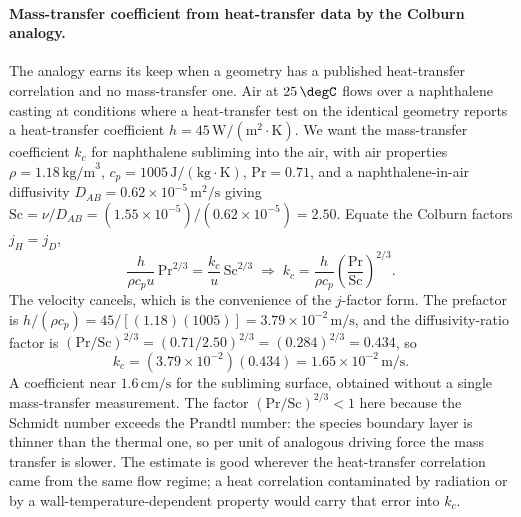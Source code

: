 \paragraph{Mass-transfer coefficient from heat-transfer data by the
Colburn analogy.} The analogy earns its keep when a geometry has a
published heat-transfer correlation and no mass-transfer one. Air at
$25\,\degC$ flows over a naphthalene casting at conditions where a
heat-transfer test on the identical geometry reports a heat-transfer
coefficient $h = 45\,\text{W}/(\text{m}^2\cdot\text{K})$. We want the
mass-transfer coefficient $k_c$ for naphthalene subliming into the air,
with air properties $\rho = 1.18\,\text{kg/m}^3$, $c_p = 1005\,\text{J}/
(\text{kg}\cdot\text{K})$, $\mathrm{Pr} = 0.71$, and a naphthalene-in-air
diffusivity $D_{AB} = 0.62\times 10^{-5}\,\si{\meter\squared\per\second}$
giving $\mathrm{Sc} = \nu/D_{AB} = (1.55\times 10^{-5})/(0.62\times
10^{-5}) = 2.50$. Equate the Colburn factors $j_H = j_D$,
\[
\frac{h}{\rho c_p u}\,\mathrm{Pr}^{2/3} = \frac{k_c}{u}\,\mathrm{Sc}^{2/3}
\;\Rightarrow\; k_c = \frac{h}{\rho c_p}
\left(\frac{\mathrm{Pr}}{\mathrm{Sc}}\right)^{2/3}.
\]
The velocity cancels, which is the convenience of the $j$-factor form. The
prefactor is $h/(\rho c_p) = 45/[(1.18)(1005)] = 3.79\times 10^{-2}\,
\text{m/s}$, and the diffusivity-ratio factor is $(\mathrm{Pr}/\mathrm{Sc})
^{2/3} = (0.71/2.50)^{2/3} = (0.284)^{2/3} = 0.434$, so
\[
k_c = (3.79\times 10^{-2})(0.434) = 1.65\times 10^{-2}\,\text{m/s}.
\]
A coefficient near $1.6\,\text{cm/s}$ for the subliming surface, obtained
without a single mass-transfer measurement. The factor
$(\mathrm{Pr}/\mathrm{Sc})^{2/3} < 1$ here because the Schmidt number
exceeds the Prandtl number: the species boundary layer is thinner than the
thermal one, so per unit of analogous driving force the mass transfer is
slower. The estimate is good wherever the heat-transfer correlation came
from the same flow regime; a heat correlation contaminated by radiation or
by a wall-temperature-dependent property would carry that error into
$k_c$.

